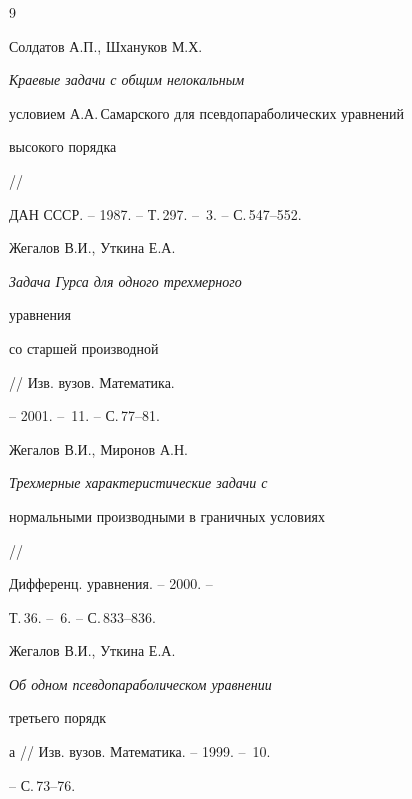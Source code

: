 \begin{thebibliography}{9} 


 




Солдатов А.П., Шхануков М.Х. {\em Краевые задачи с общим нелокальным 


условием А.А.\,Самарского для псевдопараболических уравнений 


высокого порядка} // 


ДАН СССР. -- 1987. -- Т.\,297. -- \No\,3. -- С.\,547--552. 




Жегалов В.И., Уткина Е.А. {\em Задача Гурса для одного трехмерного 


уравнения 


со старшей производной} // Изв. вузов. Математика. 


-- 2001. -- \No\,11. -- С.\,77--81. 




Жегалов В.И., Миронов А.Н. {\em Трехмерные характеристические задачи с 


нормальными производными в граничных условиях} // 


Дифференц. уравнения. -- 2000. -- 


Т.\,36. -- \No\,6. -- С.\,833--836. 




Жегалов В.И., Уткина Е.А. {\em Об одном псевдопараболическом уравнении 


третьего порядк}а // Изв. вузов. Математика. -- 1999. -- \No\,10. 


-- С.\,73--76. 


 


\end{thebibliography} 


 


\vskip 2cm 


 






 


\label{end} 


 



